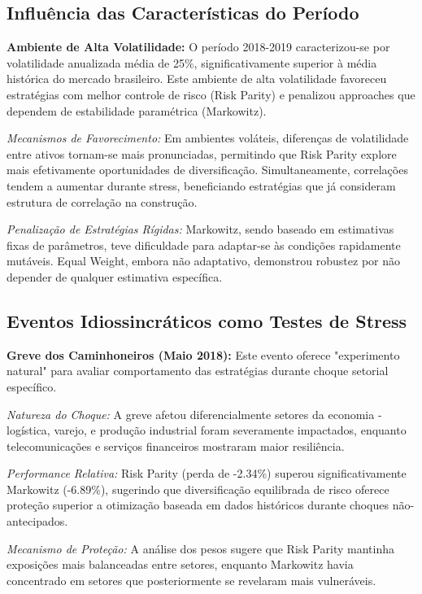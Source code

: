 \subsection{Influência das Características do Período}

\textbf{Ambiente de Alta Volatilidade:} O período 2018-2019 caracterizou-se por volatilidade anualizada média de 25\%, significativamente superior à média histórica do mercado brasileiro. Este ambiente de alta volatilidade favoreceu estratégias com melhor controle de risco (Risk Parity) e penalizou approaches que dependem de estabilidade paramétrica (Markowitz).

\textit{Mecanismos de Favorecimento:} Em ambientes voláteis, diferenças de volatilidade entre ativos tornam-se mais pronunciadas, permitindo que Risk Parity explore mais efetivamente oportunidades de diversificação. Simultaneamente, correlações tendem a aumentar durante stress, beneficiando estratégias que já consideram estrutura de correlação na construção.

\textit{Penalização de Estratégias Rígidas:} Markowitz, sendo baseado em estimativas fixas de parâmetros, teve dificuldade para adaptar-se às condições rapidamente mutáveis. Equal Weight, embora não adaptativo, demonstrou robustez por não depender de qualquer estimativa específica.

\subsection{Eventos Idiossincráticos como Testes de Stress}

\textbf{Greve dos Caminhoneiros (Maio 2018):} Este evento oferece "experimento natural" para avaliar comportamento das estratégias durante choque setorial específico.

\textit{Natureza do Choque:} A greve afetou diferencialmente setores da economia - logística, varejo, e produção industrial foram severamente impactados, enquanto telecomunicações e serviços financeiros mostraram maior resiliência.

\textit{Performance Relativa:} Risk Parity (perda de -2.34\%) superou significativamente Markowitz (-6.89\%), sugerindo que diversificação equilibrada de risco oferece proteção superior a otimização baseada em dados históricos durante choques não-antecipados.

\textit{Mecanismo de Proteção:} A análise dos pesos sugere que Risk Parity mantinha exposições mais balanceadas entre setores, enquanto Markowitz havia concentrado em setores que posteriormente se revelaram mais vulneráveis.

